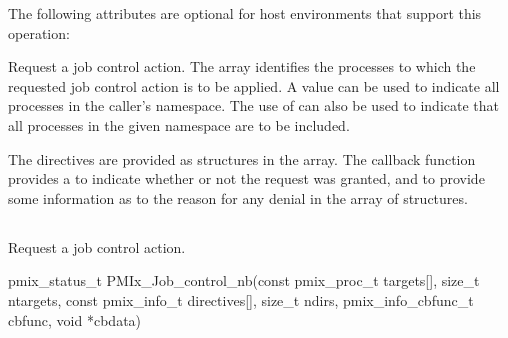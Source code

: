 \reqattrend

\optattrstart
The following attributes are optional for host environments that support this operation:


\optattrend

\descr

Request a job control action.
The  array identifies the processes to which the requested job control action is to be applied.
A  value can be used to indicate all processes in the caller's namespace.
The use of  can also be used to indicate that all processes in the given namespace are to be included.

The directives are provided as  structures in the  array.
The callback function provides a  to indicate whether or not the request was granted, and to provide some information as to the reason for any denial in the  array of  structures.

\subsection{}

\summary

Request a job control action.

\format

\cspecificstart
\begin{codepar}
pmix_status_t
PMIx_Job_control_nb(const pmix_proc_t targets[], size_t ntargets,
                    const pmix_info_t directives[], size_t ndirs,
                    pmix_info_cbfunc_t cbfunc, void *cbdata)
\end{codepar}
\cspecificend

\begin{arglist}
\end{arglist}

